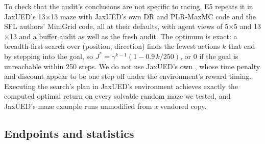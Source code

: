 To check that the audit's conclusions are not specific to racing, E5 repeats it in
JaxUED's 13$\times$13 maze with JaxUED's own DR and PLR-MaxMC code and the SFL authors'
MiniGrid code, all at their defaults, with agent views of 5$\times$5 and 13$\times$13
and a buffer audit as well as the fresh audit.
The optimum is exact: a breadth-first search over (position, direction) finds the fewest
actions $k$ that end by stepping into the goal, so $J^* = \gamma^{k-1}(1 - 0.9\,k/250)$, or 0
if the goal is unreachable within 250 steps.
We do not use JaxUED's own , whose time penalty and discount appear to
be one step off under the environment's reward timing.
Executing the search's plan in JaxUED's environment achieves exactly the computed optimal
return on every solvable random maze we tested, and JaxUED's maze example runs unmodified
from a vendored copy.

\subsection{Endpoints and statistics}
\label{sec:protocol-endpoints}

